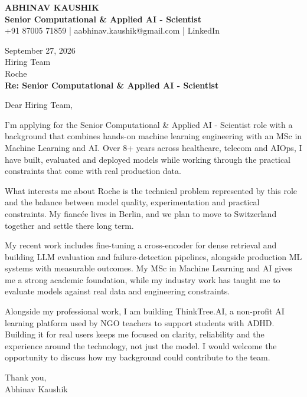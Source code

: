 \documentclass[10pt,a4paper]{article}
\begin{document}
\begin{center}
{\Large\bfseries ABHINAV KAUSHIK}\\[2pt]
{\bfseries Senior Computational \& Applied AI - Scientist}\\[2pt]
+91 87005 71859 \quad | \quad aabhinav.kaushik@gmail.com \quad | \quad LinkedIn
\end{center}
\vspace{8pt}
September 27, 2026\\[6pt]
Hiring Team\\
Roche\\[4pt]
\textbf{Re: Senior Computational \& Applied AI - Scientist}

Dear Hiring Team,

I’m applying for the Senior Computational \& Applied AI - Scientist role with a background that combines hands-on machine learning engineering with an MSc in Machine Learning and AI. Over 8+ years across healthcare, telecom and AIOps, I have built, evaluated and deployed models while working through the practical constraints that come with real production data.

What interests me about Roche is the technical problem represented by this role and the balance between model quality, experimentation and practical constraints. My fiancée lives in Berlin, and we plan to move to Switzerland together and settle there long term.

My recent work includes fine-tuning a cross-encoder for dense retrieval and building LLM evaluation and failure-detection pipelines, alongside production ML systems with measurable outcomes. My MSc in Machine Learning and AI gives me a strong academic foundation, while my industry work has taught me to evaluate models against real data and engineering constraints.

Alongside my professional work, I am building ThinkTree.AI, a non-profit AI learning platform used by NGO teachers to support students with ADHD. Building it for real users keeps me focused on clarity, reliability and the experience around the technology, not just the model. I would welcome the opportunity to discuss how my background could contribute to the team.

Thank you,\\
Abhinav Kaushik
\end{document}
